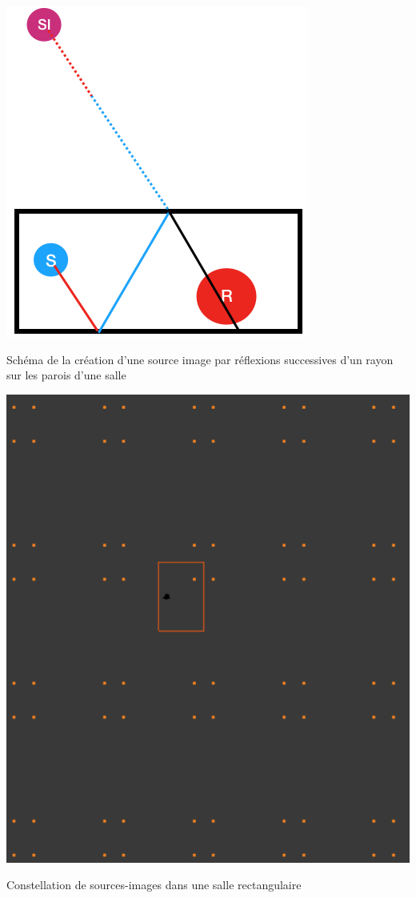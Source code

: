 \begin{figureth}
	\begin{subfigureth}{0.45\textwidth}
		\includegraphics[width=0.8\linewidth]{images/schema_SI}
		\caption{Schéma de la création d'une source image par réflexions successives d'un rayon sur les parois d'une salle}
		\label{schema_SI}
	\end{subfigureth}
	\qquad
	\begin{subfigureth}{0.45\textwidth}
		\includegraphics[width=0.8\linewidth]{images/constellation}
		\caption{Constellation de sources-images dans une salle rectangulaire}
		\label{constellation}
	\end{subfigureth}
\end{figureth}
		
